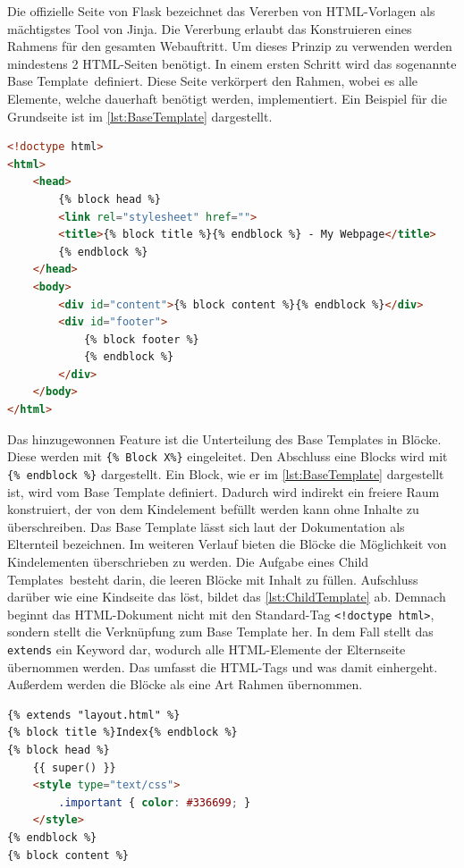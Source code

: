 \documentclass[a4paper,titlepage,halfparskip,12pt]{scrreprt}
\begin{document}
\begin{onehalfspacing}
Die offizielle Seite von Flask bezeichnet das Vererben von HTML-Vorlagen als mächtigstes Tool von Jinja. Die Vererbung erlaubt das Konstruieren eines Rahmens für den gesamten Webauftritt. Um dieses Prinzip zu verwenden werden mindestens 2 HTML-Seiten benötigt. In einem ersten Schritt wird das sogenannte \glqq Base Template\grqq\ definiert. Diese Seite verkörpert den Rahmen, wobei es alle Elemente, welche dauerhaft benötigt werden, implementiert. Ein Beispiel für die Grundseite ist im \autoref{lst:BaseTemplate} dargestellt.
\begin{lstlisting}[language=HTML,caption=Beispiel einer Grundseite für das Vererbungsprinzip,label={lst:BaseTemplate}]
<!doctype html>
<html>
	<head>
		{% block head %}
		<link rel="stylesheet" href="">
		<title>{% block title %}{% endblock %} - My Webpage</title>
		{% endblock %}
	</head>
	<body>
		<div id="content">{% block content %}{% endblock %}</div>
		<div id="footer">
			{% block footer %}
			{% endblock %}
		</div>
	</body>
</html>
\end{lstlisting}
Das hinzugewonnen Feature ist die Unterteilung des Base Templates in Blöcke. Diese werden mit \texttt{\{\% Block X\%\}} eingeleitet. Den Abschluss eine Blocks wird mit \texttt{\{\% endblock \%\}} dargestellt. Ein Block, wie er im \autoref{lst:BaseTemplate} dargestellt ist, wird vom Base Template definiert. Dadurch wird indirekt ein freiere Raum konstruiert, der von dem Kindelement befüllt werden kann ohne Inhalte zu überschreiben. Das Base Template lässt sich laut der Dokumentation als Elternteil bezeichnen. Im weiteren Verlauf bieten die Blöcke die Möglichkeit von Kindelementen überschrieben zu werden. Die Aufgabe eines \glqq Child Templates\grqq\ besteht darin, die leeren Blöcke mit Inhalt zu füllen. Aufschluss darüber wie eine Kindseite das löst, bildet das \autoref{lst:ChildTemplate} ab. Demnach beginnt das HTML-Dokument nicht mit den Standard-Tag \texttt{<!doctype html>}, sondern stellt die Verknüpfung zum Base Template her. In dem Fall stellt das \texttt{extends} ein Keyword dar, wodurch alle HTML-Elemente der Elternseite übernommen werden. Das umfasst die HTML-Tags und was damit einhergeht. Außerdem werden die Blöcke als eine Art Rahmen übernommen.
\begin{lstlisting}[language=HTML,caption=Beispiel einer Grundseite für das Vererbungsprinzip,label={lst:ChildTemplate}]
{% extends "layout.html" %}
{% block title %}Index{% endblock %}
{% block head %}
	{{ super() }}
	<style type="text/css">
		.important { color: #336699; }
	</style>
{% endblock %}
{% block content %}

\end{lstlisting}
\end{onehalfspacing}
\end{document}
